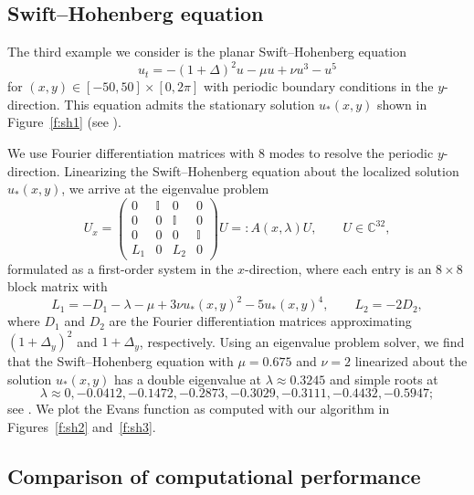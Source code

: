 \documentclass[10pt]{article}
\numberwithin{equation}{section}
\def\id{\mathbb{I}}
\newcommand{\C}{\mathbb{C}}
\begin{document}

\subsection{Swift--Hohenberg equation}\label{s:sh}

The third example we consider is the planar Swift--Hohenberg equation
\begin{equation}\label{e:sh}
u_t = -(1+\Delta)^2u - \mu u + \nu u^3 - u^5
\end{equation}
for $(x,y)\in[-50,50]\times[0,2\pi]$ with periodic boundary conditions in the $y$-direction. This equation admits the stationary solution $u_*(x,y)$ shown in Figure~\ref{f:sh1} (see \citep{Avitabile2010}).

We use Fourier differentiation matrices with 8 modes to resolve the periodic $y$-direction. Linearizing the Swift--Hohenberg equation about the localized solution $u_*(x,y)$, we arrive at the eigenvalue problem
\begin{equation}\label{e:shode}
U_x = \begin{pmatrix} 0 & \id & 0 & 0 \\ 0 & 0 & \id & 0 \\
0 & 0 & 0 & \id \\ L_1 & 0 & L_2 & 0 \end{pmatrix} U
=: A(x,\lambda) U, \qquad U\in\C^{32},
\end{equation}
formulated as a first-order system in the $x$-direction, where each entry is an $8\times8$ block matrix with
\[
L_1 = -D_1 - \lambda - \mu + 3\nu u_*(x,y)^2 - 5u_*(x,y)^4, \qquad
L_2 = -2D_2,
\]
where $D_1$ and $D_2$ are the Fourier differentiation matrices approximating $(1+\Delta_y)^2$ and $1+\Delta_y$, respectively. Using an eigenvalue problem solver, we find that the Swift--Hohenberg equation with $\mu=0.675$ and $\nu=2$ linearized about the solution $u_*(x,y)$ has a double eigenvalue at $\lambda\approx0.3245$ and simple roots at
\[
\lambda\approx0,-0.0412,-0.1472,-0.2873,-0.3029,-0.3111,-0.4432,-0.5947;
\]
see \citep{Avitabile2010}. We plot the Evans function as computed with our algorithm in Figures~\ref{f:sh2} and~\ref{f:sh3}.


\subsection{Comparison of computational performance}\label{s3.5}
\end{document}
